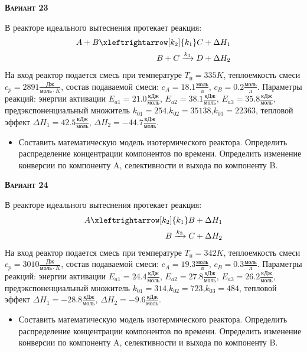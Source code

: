 \textsc{\textbf{Вариант 23}}

 В реакторе идеального вытеснения протекает реакция: \begin{equation*} \begin{aligned} A+B \xleftrightarrow[k_2]{k_1} C + \Delta H_1 \\ B + C \xrightarrow{k_3} D + \Delta H_2 \end{aligned} \end{equation*}                        На вход  реактор подается смесь при температуре $ T_{н} =  335 K$, теплоемкость смеси $c_p= 2891 \frac{Дж}{моль \cdot K}$, состав подаваемой смеси: $c_A=18.1 \frac{моль}{л}$, $c_B=0.2 \frac{моль}{л}$. Параметры реакций: энергии активации $E_{a1}=21.0 \frac{кДж}{моль}$, $E_{a2}=38.1  \frac{кДж}{моль}$, $E_{a3}=35.8  \frac{кДж}{моль}$, предэкспоненциальный множитель $k_{01}=       254$,$k_{02}=     35138$,$k_{03}=     22363$, тепловой эффект $\Delta H_1= 42.5  \frac{кДж}{моль}$, $\Delta H_2=-44.7 \frac{кДж}{моль}$.\begin{itemize} \item Составить математическую модель изотермического реактора. Определить распределение концентрации компонентов по времени. Определить изменение конверсии по компоненту A, селективности и выхода по компоненту B. \end{itemize}

\textsc{\textbf{Вариант 24}}

 В реакторе идеального вытеснения протекает реакция: \begin{equation*} \begin{aligned} A \xleftrightarrow[k_2]{k_1} B + \Delta H_1 \\ B \xrightarrow{k_3} C + \Delta H_2 \end{aligned} \end{equation*}                              На вход  реактор подается смесь при температуре $ T_{н} =  342 K$, теплоемкость смеси $c_p= 3010 \frac{Дж}{моль \cdot K}$, состав подаваемой смеси: $c_A=19.3 \frac{моль}{л}$, $c_B=0.3 \frac{моль}{л}$. Параметры реакций: энергии активации $E_{a1}=24.4 \frac{кДж}{моль}$, $E_{a2}=27.8  \frac{кДж}{моль}$, $E_{a3}=26.2  \frac{кДж}{моль}$, предэкспоненциальный множитель $k_{01}=       314$,$k_{02}=       723$,$k_{03}=       484$, тепловой эффект $\Delta H_1= -28.8  \frac{кДж}{моль}$, $\Delta H_2=-9.6 \frac{кДж}{моль}$.\begin{itemize} \item Составить математическую модель изотермического реактора. Определить распределение концентрации компонентов по времени. Определить изменение конверсии по компоненту A, селективности и выхода по компоненту B. \end{itemize}

